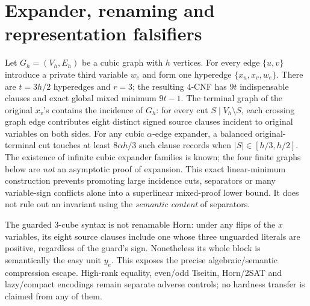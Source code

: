 \documentclass[11pt]{article}
\begin{document}
\section*{Expander, renaming and representation falsifiers}
Let $G_h=(V_h,E_h)$ be a cubic graph with $h$ vertices. For every edge $\{u,v\}$ introduce a private third variable $w_e$ and form one hyperedge $\{x_u,x_v,w_e\}$. There are $t=3h/2$ hyperedges and $r=3$; the resulting $4$-CNF has $9t$ indispensable clauses and exact global mixed minimum $9t-1$. The terminal graph of the original $x_v$'s contains the incidence of $G_h$: for every cut $S\mid V_h\setminus S$, each crossing graph edge contributes eight distinct signed source clauses incident to original variables on both sides. For any cubic $\alpha$-edge expander, a balanced original-terminal cut touches at least $8\alpha h/3$ such clause records when $|S|\in[h/3,h/2]$. The existence of infinite cubic expander families is known; the four finite graphs below are \emph{not} an asymptotic proof of expansion. This exact linear-minimum construction prevents promoting large incidence cuts, separators or many variable-sign conflicts alone into a superlinear mixed-proof lower bound. It does not rule out an invariant using the \emph{semantic content} of separators.

The guarded $3$-cube syntax is not renamable Horn: under any flips of the $x$ variables, its eight source clauses include one whose three unguarded literals are positive, regardless of the guard's sign. Nonetheless its whole block is semantically the easy unit $y_e$. This exposes the precise algebraic/semantic compression escape. High-rank equality, even/odd Tseitin, Horn/2SAT and lazy/compact encodings remain separate adverse controls; no hardness transfer is claimed from any of them.
\end{document}
